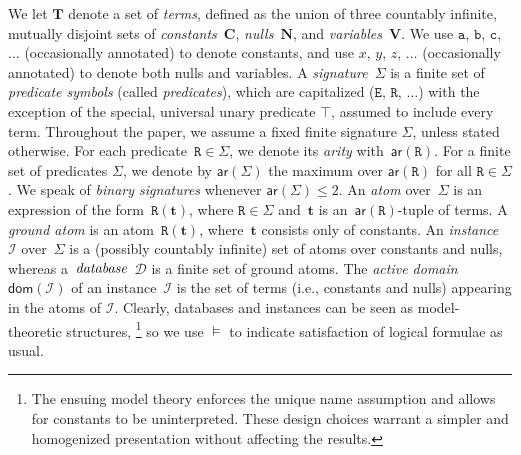 \documentclass[10pt,a4paper]{amsart}
\theoremstyle{definition}
\numberwithin{equation}{section}
\theoremstyle{plain}
\theoremstyle{definition}
\theoremstyle{myexample}
\theoremstyle{plain}
\theoremstyle{definition}
\renewcommand{\vec}[1]{\boldsymbol{#1}}
\newcommand{\instance}{\mathcal{I}}
\newcommand{\database}{\mathcal{D}}
\newcommand{\adom}[1]{\fcn{dom}(#1)}
\newcommand{\arity}[1]{\fcn{ar}(#1)}
\newcommand{\fcn}[1]{\mathsf{#1}}
\newcommand{\sig}{\Sigma}
\newcommand{\pred}[1]{\mathtt{#1}}
\newcommand{\const}[1]{\mathtt{#1}}
\newcommand{\vt}{\vec{t}}
\newcommand{\rpred}{\pred{R}}
\newcommand{\epred}{\pred{E}}
\begin{document}
\medskip {}
We let $\mathbf{T}$ denote a set of {\em terms}, defined as the union of three countably infinite, 
mutually disjoint sets of \emph{constants}~$\mathbf{C}$, \emph{nulls}~$\mathbf{N}$, and \emph{variables}~$\mathbf{V}$. We use $\const{a}$, $\const{b}$, $\const{c}$, $\ldots$ (occasionally annotated) to denote constants, and use $x$, $y$, $z$, $\ldots$ (occasionally annotated) to denote both nulls and variables.
A \emph{signature}~$\sig$ is a finite set of \emph{predicate symbols} (called \emph{predicates}), which are capitalized ($\epred$, $\rpred$, $\ldots$) with the exception of the special, universal unary predicate $\top$, assumed to include every term. %
 Throughout the paper, we assume a fixed finite signature $\sig$, unless stated otherwise. For each predicate~\mbox{$\rpred \in \sig$}, we denote its 
\emph{arity} with~$\arity{\rpred}$. For a finite set of predicates $\Sigma$, we denote by $\arity{\Sigma}$ the maximum over $\arity{\rpred}$ for all $\rpred\in\Sigma$. We speak of \emph{binary signatures} whenever $\arity{\Sigma} \leq 2$. An \emph{atom} over~$\sig$ is an expression  of the form~$\rpred(\vt)$, where $\rpred \in \sig$ and~$\vt$ is an~$\arity{\rpred}$-tuple of terms. A \emph{ground atom} is an atom~$\rpred(\vt)$, where~$\vt$ consists only of constants.
An \emph{instance}~$\instance$ over~$\sig$ is a (possibly countably infinite)
set of atoms over constants and nulls, whereas a~$\emph{database}$~$\database$ is
a finite set of ground atoms. The \emph{active domain}~$\adom{\instance}$ 
of an instance~$\instance$ is the set of terms (i.e., constants and nulls) appearing in the atoms of $\instance$. %
Clearly, databases and instances can be seen as model-theoretic structures,%
\footnote{The ensuing model theory enforces the unique name assumption and allows for constants to be uninter\-preted. These design choices warrant a simpler and homogenized presentation without affecting the results.} 
so we use %
$\models$ to indicate satisfaction of logical formulae as usual. 
\end{document}
